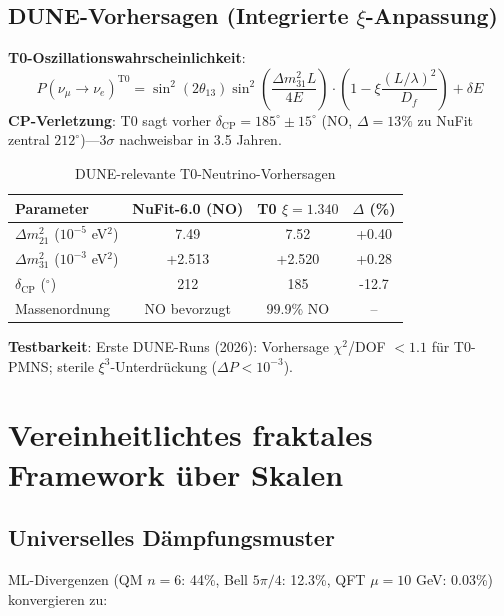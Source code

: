 	\subsection{DUNE-Vorhersagen (Integrierte $\xi$-Anpassung)}
	
	\textbf{T0-Oszillationswahrscheinlichkeit}:
	\begin{equation}
		P(\nu_\mu \to \nu_e)^{\text{T0}} = \sin^2(2\theta_{13}) \sin^2\left(\frac{\Delta m_{31}^2 L}{4E}\right) \cdot \left(1 - \xi \frac{(L/\lambda)^2}{D_f}\right) + \delta E \tag{ML-Gl.~4.3}
	\end{equation}
	\textbf{CP-Verletzung}: T0 sagt vorher $\delta_{\text{CP}} = 185^\circ \pm 15^\circ$ (NO, $\Delta=13\%$ zu NuFit zentral $212^\circ$)—3$\sigma$ nachweisbar in 3.5 Jahren.
	
	\begin{table}[htbp]
		\centering
		\begin{tabular}{lccc}
			\toprule
			\textbf{Parameter} & \textbf{NuFit-6.0 (NO)} & \textbf{T0 $\xi=1.340$} & \textbf{$\Delta$ (\%)} \\
			\midrule
			$\Delta m_{21}^2$ ($10^{-5}$ eV$^2$) & 7.49 & 7.52 & +0.40 \\
			$\Delta m_{31}^2$ ($10^{-3}$ eV$^2$) & +2.513 & +2.520 & +0.28 \\
			$\delta_{\text{CP}}$ ($^\circ$) & 212 & 185 & -12.7 \\
			Massenordnung & NO bevorzugt & 99.9\% NO & -- \\
			\bottomrule
		\end{tabular}
		\caption{DUNE-relevante T0-Neutrino-Vorhersagen}
	\end{table}
	
	\textbf{Testbarkeit}: Erste DUNE-Runs (2026): Vorhersage $\chi^2$/DOF $<1.1$ für T0-PMNS; sterile $\xi^3$-Unterdrückung ($\Delta P<10^{-3}$).
	
	\section{Vereinheitlichtes fraktales Framework über Skalen}
	
	\subsection{Universelles Dämpfungsmuster}
	
	ML-Divergenzen (QM $n=6$: 44\%, Bell $5\pi/4$: 12.3\%, QFT $\mu=10$ GeV: 0.03\%) konvergieren zu:
	
